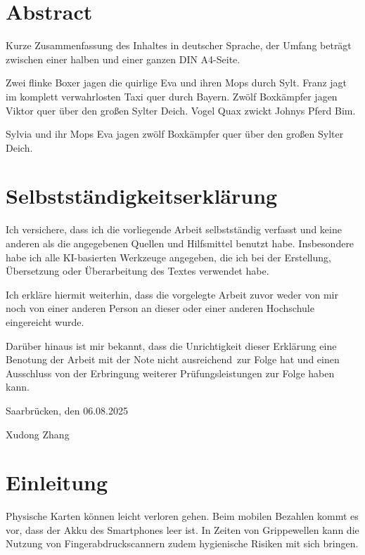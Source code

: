\documentclass[paper=a4,fontsize=12pt,ngerman]{scrartcl}
\begin{document}
\pagestyle{plain}



\section*{Abstract}
Kurze Zusammenfassung des Inhaltes in deutscher Sprache, der Umfang beträgt 
zwischen einer halben und einer ganzen DIN A4-Seite.

Zwei flinke Boxer jagen die quirlige Eva und ihren Mops durch Sylt. Franz 
jagt im komplett verwahrlosten Taxi quer durch Bayern. Zwölf Boxkämpfer jagen 
Viktor quer über den großen Sylter Deich. Vogel Quax zwickt Johnys Pferd Bim.

Sylvia und ihr Mops Eva jagen zwölf Boxkämpfer quer über den großen Sylter Deich.


\newpage
\section*{Selbstständigkeitserklärung}
Ich versichere, dass ich die vorliegende Arbeit selbstständig verfasst und 
keine anderen als die angegebenen Quellen und Hilfsmittel benutzt habe.
Insbesondere habe ich alle KI-basierten Werkzeuge angegeben, die ich bei
der Erstellung, Übersetzung oder Überarbeitung des Textes verwendet habe.

Ich erkläre hiermit weiterhin, dass die vorgelegte Arbeit zuvor weder von mir 
noch von einer anderen Person an dieser oder einer anderen Hochschule 
eingereicht wurde.

Darüber hinaus ist mir bekannt, dass die Unrichtigkeit dieser Erklärung eine 
Benotung der Arbeit mit der Note \glqq nicht ausreichend\grqq \ zur Folge hat 
und einen Ausschluss von der Erbringung weiterer Prüfungsleistungen zur Folge 
haben kann.
\bigskip
 
Saarbrücken, den 06.08.2025

\smallskip
Xudong Zhang




\clearpage
\tableofcontents 

\clearpage
{}

\section{Einleitung}
Physische Karten können leicht verloren gehen. Beim mobilen Bezahlen kommt es 
vor, dass der Akku des Smartphones leer ist. In Zeiten von Grippewellen kann 
die Nutzung von Fingerabdruckscannern zudem hygienische Risiken mit sich 
bringen.
\end{document}
